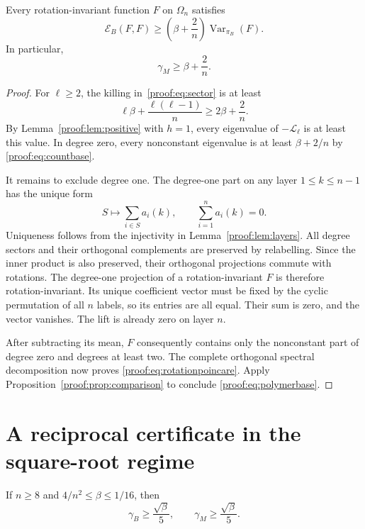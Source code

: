 \begin{proposition}\label{proof:prop:base}
Every rotation-invariant function $F$ on $\Omega_n$ satisfies
\begin{equation}\label{proof:eq:rotationpoincare}
 \mathcal E_B(F,F)\geq
 \left(\beta+\frac2n\right)\operatorname{Var}_{\pi_B}(F).
\end{equation}
In particular,
\begin{equation}\label{proof:eq:polymerbase}
 \gamma_M\geq\beta+\frac2n.
\end{equation}
\end{proposition}

\begin{proof}
For $\ell\geq2$, the killing in~\eqref{proof:eq:sector} is at least
\[
 \ell\beta+\frac{\ell(\ell-1)}n\geq2\beta+\frac2n.
\]
By Lemma~\ref{proof:lem:positive} with $h=1$, every eigenvalue of
$-\mathcal L_\ell$ is at least this value. In degree zero, every
nonconstant eigenvalue is at least $\beta+2/n$ by
\eqref{proof:eq:countbase}.

It remains to exclude degree one. The degree-one part on any layer
$1\leq k\leq n-1$ has the unique form
\[
 S\longmapsto\sum_{i\in S}a_i(k),\qquad\sum_{i=1}^na_i(k)=0.
\]
Uniqueness follows from the injectivity in
Lemma~\ref{proof:lem:layers}. All degree sectors and their
orthogonal complements are preserved by relabelling. Since the
inner product is also preserved, their orthogonal projections
commute with rotations. The degree-one projection of a
rotation-invariant $F$ is therefore rotation-invariant. Its unique
coefficient vector must be fixed by the cyclic permutation of all
$n$ labels, so its entries are all equal. Their sum is zero, and
the vector vanishes. The lift is already zero on layer $n$.

After subtracting its mean, $F$ consequently contains only the
nonconstant part of degree zero and degrees at least two. The
complete orthogonal spectral decomposition now proves
\eqref{proof:eq:rotationpoincare}. Apply
Proposition~\ref{proof:prop:comparison} to conclude
\eqref{proof:eq:polymerbase}.
\end{proof}

\section{A reciprocal certificate in the square-root regime}
\label{proof:sec:reciprocal}

\begin{proposition}\label{proof:prop:squareroot}
If $n\geq8$ and $4/n^2\leq\beta\leq1/16$, then
\begin{equation}\label{proof:eq:squareroot}
 \gamma_B\geq\frac{\sqrt\beta}{5},
 \qquad
 \gamma_M\geq\frac{\sqrt\beta}{5}.
\end{equation}
\end{proposition}

